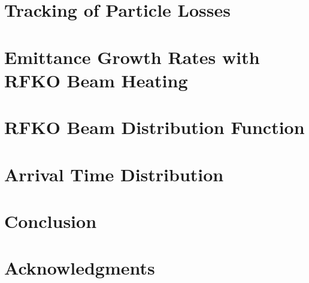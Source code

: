 \documentclass[aps,prstab,onecolumn,preprint,nofootinbib]{revtex4-1}
\begin{document}
\section{\label{sec:loss}Tracking of Particle Losses}



\section{\label{sec:emit}Emittance Growth Rates with RFKO Beam Heating}

\section{\label{sec:rfko}RFKO Beam Distribution Function}

\section{\label{sec:arrival}Arrival Time Distribution}

\section{\label{sec:conclusion}Conclusion}

\section{\label{thanks}Acknowledgments}

\begin{thebibliography}{77}


\end{thebibliography}
\end{document}

